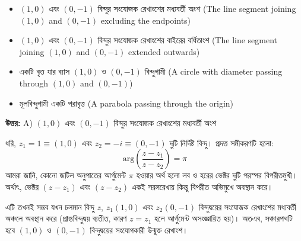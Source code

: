 \documentclass[12pt, a4paper]{article}
\begin{document}
\begin{itemize}[label={}, leftmargin=1cm, itemsep=0.5em]
    \item[\textbf{A)}] $(1, 0)$ এবং $(0, -1)$ বিন্দুর সংযোজক রেখাংশের মধ্যবর্তী অংশ (The line segment joining $(1, 0)$ and $(0, -1)$ excluding the endpoints)
    \item[\textbf{B)}] $(1, 0)$ এবং $(0, -1)$ বিন্দুর সংযোজক রেখাংশের বাইরের বর্ধিতাংশ (The line segment joining $(1, 0)$ and $(0, -1)$ extended outwards)
    \item[\textbf{C)}] একটি বৃত্ত যার ব্যাস $(1, 0)$ ও $(0, -1)$ বিন্দুগামী (A circle with diameter passing through $(1, 0)$ and $(0, -1)$)
    \item[\textbf{D)}] মূলবিন্দুগামী একটি পরাবৃত্ত (A parabola passing through the origin)
\end{itemize}

\vspace{0.5em}
\begin{tcolorbox}[answerbox]
    \textbf{\color{success} উত্তর:} A) $(1, 0)$ এবং $(0, -1)$ বিন্দুর সংযোজক রেখাংশের মধ্যবর্তী অংশ
\end{tcolorbox}
\vspace{1em}

\begin{tcolorbox}[solutionbox={সমাধান (Solution)}]
    \noindent
    ধরি, $z_1 = 1 \equiv (1, 0)$ এবং $z_2 = -i \equiv (0, -1)$ দুটি নির্দিষ্ট বিন্দু। প্রদত্ত সমীকরণটি হলো:
    \[ \text{arg}\left(\frac{z - z_1}{z - z_2}\right) = \pi \]
    আমরা জানি, কোনো জটিল অনুপাতের আর্গুমেন্ট $\pi$ হওয়ার অর্থ হলো লব ও হরের ভেক্টর দুটি পরস্পর বিপরীতমুখী। অর্থাৎ, ভেক্টর $(z - z_1)$ এবং $(z - z_2)$ একই সরলরেখায় কিন্তু বিপরীত অভিমুখে অবস্থান করে। 
    
    \vspace{0.5em}
    এটি তখনই সম্ভব যখন চলমান বিন্দু $z$, $z_1(1, 0)$ এবং $z_2(0, -1)$ বিন্দুদ্বয়ের সংযোজক রেখাংশের মধ্যবর্তী অঞ্চলে অবস্থান করে (প্রান্তবিন্দুদ্বয় ব্যতীত, কারণ $z = z_1$ হলে আর্গুমেন্ট অসংজ্ঞায়িত হয়)। 
    অতএব, সঞ্চারপথটি হবে $(1, 0)$ ও $(0, -1)$ বিন্দুদ্বয়ের সংযোগকারী উন্মুক্ত রেখাংশ।
\end{tcolorbox}

\vspace{1.5em}
\end{document}
